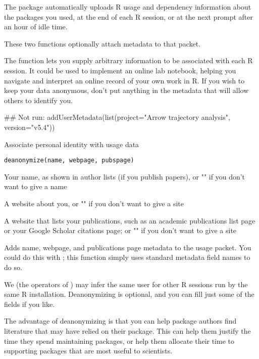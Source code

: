 \documentclass[letterpaper]{book}
\begin{document}
%
\begin{Details}\relax
The  package automatically uploads R usage and dependency
information about the packages you used, at the end of each R session,
or at the next prompt after an hour of idle time.

These two functions optionally attach metadata to that packet.

The  function lets you supply arbitrary information to be
associated with each R session.  It could be used to implement an online lab notebook,
helping you navigate and interpret an online record of your own work in R.
If you wish to keep your data anonymous, don't put anything in the metadata
that will allow others to identify you.
\end{Details}
%
\begin{Examples}
\begin{ExampleCode}
## Not run: addUserMetadata(list(project="Arrow trajectory analysis", version="v5.4"))
\end{ExampleCode}
\end{Examples}
%
\begin{Description}\relax
Associate personal identity with usage data
\end{Description}
%
\begin{Usage}
\begin{verbatim}
deanonymize(name, webpage, pubspage)
\end{verbatim}
\end{Usage}
%
\begin{Arguments}
\begin{ldescription}
\item[\code{name}] Your name, as shown in author lists (if you publish papers),
or "" if you don't want to give a name

\item[\code{webpage}] A website about you,
or "" if you don't want to give a site

\item[\code{pubspage}] A website that lists your publications,
such as an academic publications list page
or your Google Scholar citations page;
or "" if you don't want to give a site
\end{ldescription}
\end{Arguments}
%
\begin{Details}\relax
Adds name, webpage, and publications page metadata to the usage packet.
You could do this with ; this function simply
uses standard metadata field names to do so.

We (the operators of ) may infer the same user for other
R sessions run by the same R installation.  Deanonymizing is optional,
and you can fill just some of the fields if you like.

The advantage of deanonymizing is that you can help package authors find
literature that may have relied on their package. This can help
them justify the time they spend maintaining packages, or help them
allocate their time to supporting packages that are most useful to scientists.
\end{Details}
\end{document}
